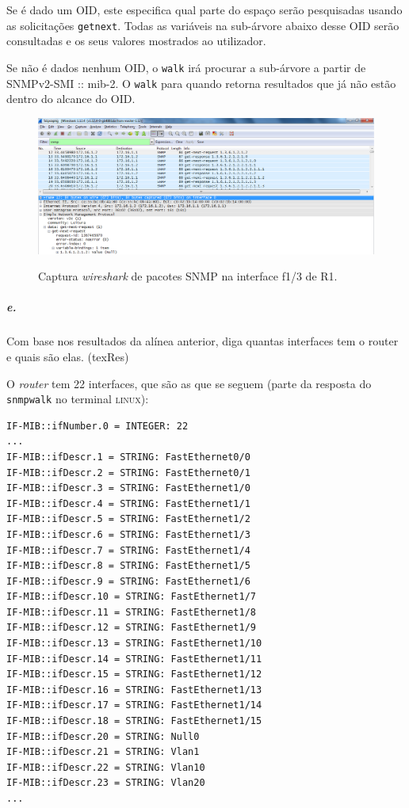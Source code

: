Se é dado um OID, este especifica qual parte do espaço serão pesquisadas usando as solicitações \texttt{getnext}. Todas as variáveis na sub-árvore abaixo desse OID serão consultadas e os seus valores mostrados ao utilizador.

Se não é dados nenhum OID, o \texttt{walk} irá procurar a sub-árvore a partir de SNMPv2-SMI :: mib-2.
O \texttt{walk} para quando retorna resultados que já não estão dentro do alcance do OID.

\begin{figure}[h]
\centering
\includegraphics[width=1\textwidth, height=0.3\textheight]{5d.png}
\label{fig:7-capturaWireshark}
\caption{Captura \emph{wireshark} de pacotes SNMP na interface \textsf{f1/3} de \textsf{R1}.}
\end{figure}

\newpage

\subparagraph{e.}
Com base nos resultados da alínea anterior, diga quantas interfaces tem o router e quais são elas. (texRes)

O \emph{router} tem 22 interfaces, que são as que se seguem (parte da resposta do \texttt{snmpwalk} no terminal \textsc{linux}):

\begin{verbatim}
IF-MIB::ifNumber.0 = INTEGER: 22
...
IF-MIB::ifDescr.1 = STRING: FastEthernet0/0
IF-MIB::ifDescr.2 = STRING: FastEthernet0/1
IF-MIB::ifDescr.3 = STRING: FastEthernet1/0
IF-MIB::ifDescr.4 = STRING: FastEthernet1/1
IF-MIB::ifDescr.5 = STRING: FastEthernet1/2
IF-MIB::ifDescr.6 = STRING: FastEthernet1/3
IF-MIB::ifDescr.7 = STRING: FastEthernet1/4
IF-MIB::ifDescr.8 = STRING: FastEthernet1/5
IF-MIB::ifDescr.9 = STRING: FastEthernet1/6
IF-MIB::ifDescr.10 = STRING: FastEthernet1/7
IF-MIB::ifDescr.11 = STRING: FastEthernet1/8
IF-MIB::ifDescr.12 = STRING: FastEthernet1/9
IF-MIB::ifDescr.13 = STRING: FastEthernet1/10
IF-MIB::ifDescr.14 = STRING: FastEthernet1/11
IF-MIB::ifDescr.15 = STRING: FastEthernet1/12
IF-MIB::ifDescr.16 = STRING: FastEthernet1/13
IF-MIB::ifDescr.17 = STRING: FastEthernet1/14
IF-MIB::ifDescr.18 = STRING: FastEthernet1/15
IF-MIB::ifDescr.20 = STRING: Null0
IF-MIB::ifDescr.21 = STRING: Vlan1
IF-MIB::ifDescr.22 = STRING: Vlan10
IF-MIB::ifDescr.23 = STRING: Vlan20
...
\end{verbatim}


